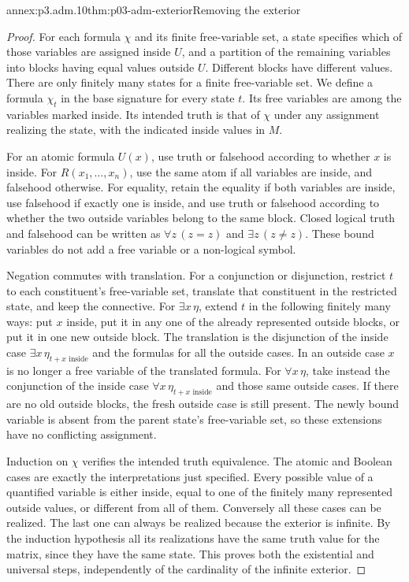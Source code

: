 \begin{annexitem}{annex:p3.adm.10}{thm:p03-adm-exterior}{Removing the exterior}
\begin{proof}
For each formula \(\chi\) and its finite free-variable set, a state
specifies which of those variables are assigned inside \(U\), and a
partition of the remaining variables into blocks having equal values
outside \(U\). Different blocks have different values. There are only
finitely many states for a finite free-variable set. We define a formula
\(\chi_t\) in the base signature for every state \(t\). Its free variables
are among the variables marked inside. Its intended truth is that of
\(\chi\) under any assignment realizing the state, with the indicated
inside values in \(M\).

For an atomic formula \(U(x)\), use truth or falsehood according to
whether \(x\) is inside. For \(R(x_1,\ldots,x_n)\), use the same atom
if all variables are inside, and falsehood otherwise. For equality,
retain the equality if both variables are inside, use falsehood if
exactly one is inside, and use truth or falsehood according to whether
the two outside variables belong to the same block. Closed logical
truth and falsehood can be written as \(\forall z\,(z=z)\) and
\(\exists z\,(z\ne z)\). These bound variables do not add a free
variable or a non-logical symbol.

Negation commutes with translation. For a conjunction or disjunction,
restrict \(t\) to each constituent's free-variable set, translate that
constituent in the restricted state, and keep the connective.
For \(\exists x\,\eta\), extend \(t\) in the following finitely many
ways: put \(x\) inside, put it in any one of the already represented
outside blocks, or put it in one new outside block. The translation is
the disjunction of the inside case \(\exists x\,\eta_{t+x\text{ inside}}\)
and the formulas for all the outside cases. In an outside case \(x\)
is no longer a free variable of the translated formula. For
\(\forall x\,\eta\), take instead the conjunction of the inside case
\(\forall x\,\eta_{t+x\text{ inside}}\) and those same outside cases.
If there are no old outside blocks, the fresh outside case is still
present. The newly bound variable is absent from the parent state's
free-variable set, so these extensions have no conflicting assignment.

Induction on \(\chi\) verifies the intended truth equivalence. The
atomic and Boolean cases are exactly the interpretations just specified.
Every possible value of a quantified variable is either inside, equal
to one of the finitely many represented outside values, or different
from all of them. Conversely all these cases can be realized. The last
one can always be realized because the exterior is infinite. By the
induction hypothesis all its realizations have the same truth value
for the matrix, since they have the same state. This proves both the
existential and universal steps, independently of the cardinality of
the infinite exterior.


\end{proof}
\end{annexitem}

